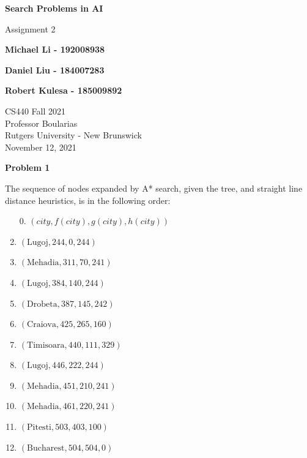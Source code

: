 \documentclass[11pt]{article}
\begin{document}
    \begin{titlepage}
        \begin{center}
            \vspace{1cm}

            \Huge
            \textbf{Search Problems in AI}

            \vspace{0.5cm}
            \LARGE
            Assignment 2

            \vspace{1cm}

            \textbf{Michael Li - 192008938}

            \textbf{Daniel Liu - 184007283}

            \textbf{Robert Kulesa - 185009892}


            \vfill


            \vspace{0.8cm}

            \Large
            CS440 Fall 2021\\
            Professor Boularias\\
            Rutgers University - New Brunswick\\
            November 12, 2021

        \end{center}
    \end{titlepage}

    \begin{center}
        \Large
        \textbf{Problem 1}
    \end{center}
    \normalsize
    The sequence of nodes expanded by A* search, given the tree,
    and straight line distance heuristics, is in the following order:
    \begin{enumerate}
        \item[0.] $\left(city, f(city), g(city), h(city)\right)$
        \item $\left(\text{Lugoj}, 244, 0, 244\right)$
        \item $\left(\text{Mehadia}, 311, 70, 241\right)$
        \item $\left(\text{Lugoj}, 384, 140, 244\right)$
        \item $\left(\text{Drobeta}, 387, 145, 242\right)$
        \item $\left(\text{Craiova}, 425, 265, 160\right)$
        \item $\left(\text{Timisoara}, 440, 111, 329\right)$
        \item $\left(\text{Lugoj}, 446, 222, 244\right)$
        \item $\left(\text{Mehadia}, 451, 210, 241\right)$
        \item $\left(\text{Mehadia}, 461, 220, 241\right)$
        \item $\left(\text{Pitesti}, 503, 403, 100\right)$
        \item $\left(\text{Bucharest}, 504, 504, 0\right)$
    \end{enumerate}
\end{document}
